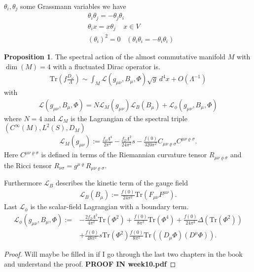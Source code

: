 \documentclass[a4paper]{article}
\theoremstyle{definition}
\theoremstyle{definition}
\theoremstyle{definition}
\theoremstyle{theorem}
\theoremstyle{theorem}
\theoremstyle{theorem}
\newtheorem{proposition}{Proposition}
\begin{document}
$\theta _i, \theta _j$ some Grassmann variables we have
\begin{align}
    &\theta _i \theta _j = -\theta _j \theta _i \\
    &\theta _i x = x\theta _j \;\;\;\; x\in V \\
    &(\theta_i)^2 = 0 \;\;\; (\theta _i \theta _i = -\theta _i \theta _i)
\end{align}
\begin{proposition}
    The spectral action of the almost commutative manifold $M$ with $\dim(M)
    =4$ with a fluctuated Dirac operator is.
    \begin{align}
        \text{Tr}(f\frac{D_\omega}{\Lambda}) \sim \int_M \mathcal{L}(g_{\mu\nu},
         B_\mu, \Phi) \sqrt{g}\ d^4x + O(\Lambda^{-1})
    \end{align}
    with
    \begin{align}
        \mathcal{L}(g_{\mu\nu}, B_\mu, \Phi) =
        N\mathcal{L}_M(g_{\mu\nu})
        \mathcal{L}_B(B_\mu)+
        \mathcal{L}_\phi(g_{\mu\nu}, B_\mu, \Phi)
    \end{align}
    where $N=4$ and $\mathcal{L}_M$ is the Lagrangian of the spectral triple
    $(C^\infty(M) , L^2(S), D_M)$
    \begin{align}\label{lagr}
        \mathcal{L}_M(g_{\mu\nu}) := \frac{f_4 \Lambda ^4}{2\pi^2} -
        \frac{f_2 \Lambda^2}{24\pi ^2}s - \frac{f(0)}{320\pi^2} C_{\mu\nu
        \varrho \sigma}C^{\mu\nu \varrho \sigma}.
    \end{align}
    Here $C^{\mu\nu \varrho \sigma}$ is defined in terms of the Riemannian
    curvature tensor $R_{\mu\nu \varrho \sigma}$ and the Ricci tensor
    $R_{\nu\sigma} = g^{\mu\varrho} R_{\mu\nu \varrho\sigma}$.


    Furthermore $\mathcal{L}_B$ describes the kinetic term of the gauge field
    \begin{align}
        \mathcal{L}_B(B_\mu) := \frac{f(0)}{24\pi^2}
        \text{Tr}(F_{\mu\nu}F^{\mu\nu}).
    \end{align}
    Last $\mathcal{L}_\phi$ is the scalar-field Lagrangian with a boundary
    term.
    \begin{align}
        \mathcal{L}_\phi(g_{\mu\nu}, B_\mu, \Phi) :=
        &-\frac{2f_2\Lambda^2}{4\pi^2}\text{Tr}(\Phi^2) + \frac{f(0)}{8\pi^2}
        \text{Tr}(\Phi^4) + \frac{f(0)}{24\pi^2} \Delta(\text{Tr}(\Phi^2))\\
        &+ \frac{f(0)}{48\pi^2}s\text{Tr}(\Phi^2)
        \frac{f(0)}{8\pi^2}\text{Tr}((D_\mu \Phi)(D^\mu \Phi)).
    \end{align}
\end{proposition}
\begin{proof}
    Will maybe be filled in if I go through the last two chapters in the
    book and understand the proof.
    \textbf{PROOF IN week10.pdf}
\end{proof}
\end{document}
